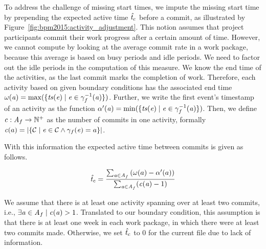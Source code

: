 To address the challenge of missing start times, we impute the missing start time by prepending the expected active time $\mathit{\hat{t}_{c}}$ before a commit, as illustrated by Figure~\ref{fig:bpm2015:activity_adjustment}. This notion assumes that project participants commit their work progress after a certain amount of time. However, we cannot compute \expectedActiveTime by looking at the average commit rate in a work package, because this average is based on busy periods and idle periods. We need to factor out the idle periods in the computation of this measure.
We know the end time of the activities, as the last commit marks the completion of work. Therefore, each activity \activity based on given boundary conditions has the associated end time $\omega(\mathit{a}) = \max(\lbrace \mathit{ts}(\mathit{e}) \mid \mathit{e} \in \gamma_{f}^{-1}(\mathit{a})  \rbrace)$. Further, we write the first event's timestamp of an activity as the function $\alpha'(\mathit{a}) = \min(\lbrace \mathit{ts}(\mathit{e}) \mid \mathit{e} \in \gamma_{f}^{-1}(\mathit{a})  \rbrace)$.
Then, we define $\mathit{c}:\mathit{A}_{f} \rightarrow \mathbb{N^+}$ as the number of commits in one activity, formally $\mathit{c}(a)=|\lbrace \mathcal{C} \mid \mathit{e} \in \mathcal{C} \wedge \gamma_{f}(\mathit{e})=a\rbrace |$.

With this information the expected active time between commits \expectedActiveTime is given as follows.

\begin{equation}
	\mathit{\hat{t}_{c}} = \frac{\sum_{\mathit{a} \in \mathit{A}_{f}} \left(\omega(a) - \alpha'(a)\right)}{\sum_{\mathit{a} \in \mathit{A}_{f}} (\mathit{c}(\mathit{a})-1) }
\end{equation}

We assume that there is at least one activity spanning over at least two commits, i.e., $\exists \mathit{a} \in \mathit{A}_{f} \mid \mathit{c}(\mathit{a}) > 1 $. Translated to our boundary condition, this assumption is that there is at least one week in each work package, in which there were at least two commits made. Otherwise, we set $\mathit{\hat{t}_{c}}$ to 0 for the current file \file due to lack of information.

